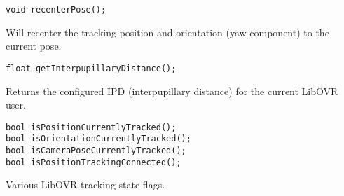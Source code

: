 \begin{lstlisting}
void recenterPose();
\end{lstlisting}
Will recenter the tracking position and orientation (yaw component) to the current pose.

\begin{lstlisting}
float getInterpupillaryDistance();
\end{lstlisting}
Returns the configured IPD (interpupillary distance) for the current LibOVR user.

\begin{lstlisting}
bool isPositionCurrentlyTracked();
bool isOrientationCurrentlyTracked();
bool isCameraPoseCurrentlyTracked();
bool isPositionTrackingConnected();
\end{lstlisting}
Various LibOVR tracking state flags.